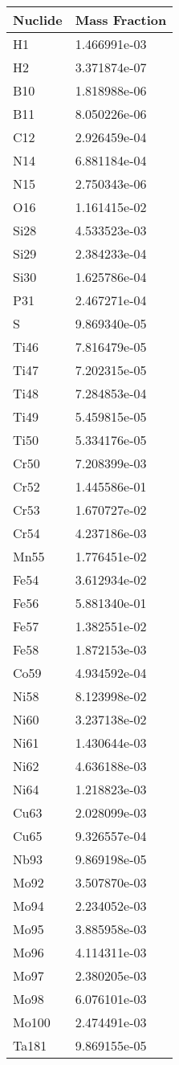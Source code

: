 \begin{centering}
\begin{longtable}[ht!]
\caption{Table showing the isotopic description of material M400}
\label{table:material_M400}
\end{longtable}\clearpage

\begin{longtable}[ht!]
{ p{} | p{} }
\hline
Nuclide & Mass Fraction\\
\hline
H1 & 1.466991e-03\\
H2 & 3.371874e-07\\
B10 & 1.818988e-06\\
B11 & 8.050226e-06\\
C12 & 2.926459e-04\\
N14 & 6.881184e-04\\
N15 & 2.750343e-06\\
O16 & 1.161415e-02\\
Si28 & 4.533523e-03\\
Si29 & 2.384233e-04\\
Si30 & 1.625786e-04\\
P31 & 2.467271e-04\\
S & 9.869340e-05\\
Ti46 & 7.816479e-05\\
Ti47 & 7.202315e-05\\
Ti48 & 7.284853e-04\\
Ti49 & 5.459815e-05\\
Ti50 & 5.334176e-05\\
Cr50 & 7.208399e-03\\
Cr52 & 1.445586e-01\\
Cr53 & 1.670727e-02\\
Cr54 & 4.237186e-03\\
Mn55 & 1.776451e-02\\
Fe54 & 3.612934e-02\\
Fe56 & 5.881340e-01\\
Fe57 & 1.382551e-02\\
Fe58 & 1.872153e-03\\
Co59 & 4.934592e-04\\
Ni58 & 8.123998e-02\\
Ni60 & 3.237138e-02\\
Ni61 & 1.430644e-03\\
Ni62 & 4.636188e-03\\
Ni64 & 1.218823e-03\\
Cu63 & 2.028099e-03\\
Cu65 & 9.326557e-04\\
Nb93 & 9.869198e-05\\
Mo92 & 3.507870e-03\\
Mo94 & 2.234052e-03\\
Mo95 & 3.885958e-03\\
Mo96 & 4.114311e-03\\
Mo97 & 2.380205e-03\\
Mo98 & 6.076101e-03\\
Mo100 & 2.474491e-03\\
Ta181 & 9.869155e-05\\


\end{longtable}
\end{centering}
